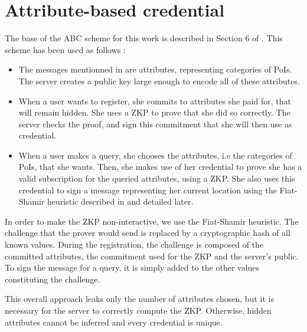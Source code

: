 \documentclass[10pt,conference,compsocconf]{IEEEtran}
\begin{document}
\section{Attribute-based credential}
The base of the ABC scheme for this work is described in Section 6 of \cite{PS_Scheme}. This scheme has been used as follows : 
\begin{itemize}
    \item The messages mentionned in \cite{PS_Scheme} are attributes, representing categories of PoIs. The server creates a public key large enough to encode all of these attributes. 
    \item When a user wants to register, she commits to attributes she paid for, that will remain hidden. She uses a ZKP to prove that she did so correctly. The server checks the proof, and sign this commitment that she will then use as credential.
    \item When a user makes a query, she chooses the attributes, i.e the categories of PoIs, that she wants. Then, she makes use of her credential to prove she has a valid subscription for the queried attributes, using a ZKP. She also uses this credential to sign a message representing her current location using the Fiat-Shamir heuristic described in \cite{FSheuristic} and detailed later.
\end{itemize}

In order to make the ZKP non-interactive, we use the Fiat-Shamir heuristic. The challenge that the prover would send is replaced by a cryptographic hash of all known values. During the registration, the challenge is composed of the committed attributes, the commitment used for the ZKP and the server's public. To sign the message for a query, it is simply added to the other values constituting the challenge. 

This overall approach leaks only the number of attributes chosen, but it is necessary for the server to correctly compute the ZKP. Otherwise, hidden attributes cannot be inferred and every credential is unique.
\end{document}
